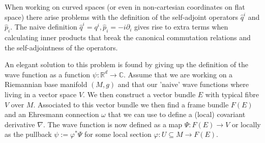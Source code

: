 	\begin{construct}
		When working on curved spaces (or even in non-cartesian coordinates on flat space) there arise problems with the definition of the self-adjoint operators $\hat{q}^i$ and $\hat{p}_i$. The naive definition $\hat{q}^i = q^i, \hat{p}_i = -i\partial_i$ gives rise to extra terms when calculating inner products that break the canonical commutation relations and the self-adjointness of the operators.
	
		An elegant solution to this problem is found by giving up the definition of the wave function as a function $\psi:\mathbb{R}^d\rightarrow\mathbb{C}$. Assume that we are working on a Riemannian base manifold $(M, g)$ and that our 'naive' wave functions where living in a vector space $V$. We then construct a vector bundle $E$ with typical fibre $V$ over $M$. Associated to this vector bundle we then find a frame bundle $F(E)$ and an Ehresmann connection $\omega$ that we can use to define a (local) covariant derivative $\nabla$. The wave function is now defined as a map $\Psi: F(E)\rightarrow V$ or locally as the pullback $\psi := \varphi^*\Psi$ for some local section $\varphi:U\subseteq M\rightarrow F(E)$.
		

\end{construct}
